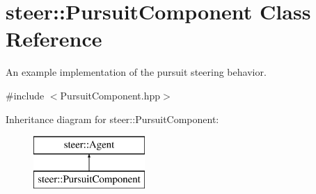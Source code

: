 \hypertarget{classsteer_1_1_pursuit_component}{\section{steer\-:\-:Pursuit\-Component Class Reference}
\label{classsteer_1_1_pursuit_component}
}


An example implementation of the pursuit steering behavior.  




{\ttfamily \#include $<$Pursuit\-Component.\-hpp$>$}

Inheritance diagram for steer\-:\-:Pursuit\-Component\-:\begin{figure}[H]
\begin{center}
\leavevmode
\includegraphics[height=2.000000cm]{classsteer_1_1_pursuit_component}
\end{center}
\end{figure}
